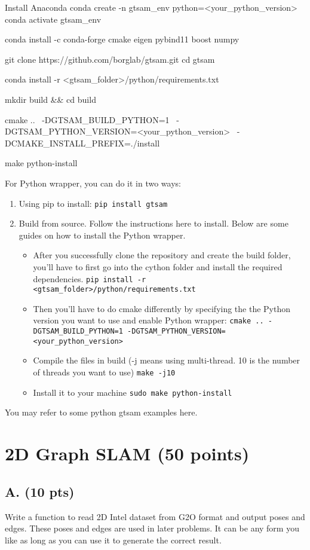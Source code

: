 \documentclass[tp]{lcc}
\begin{document}
Install Anaconda 
conda create -n gtsam_env python=<your\_python\_version>
conda activate gtsam_env

conda install -c conda-forge cmake eigen pybind11 boost numpy

git clone https://github.com/borglab/gtsam.git
cd gtsam

conda install -r <gtsam\_folder>/python/requirements.txt

mkdir build && cd build

cmake .. \
  -DGTSAM_BUILD_PYTHON=1 \
  -DGTSAM_PYTHON_VERSION=<your\_python\_version> \
  -DCMAKE_INSTALL_PREFIX=./install

make python-install


For Python wrapper, you can do it in two ways:

\begin{enumerate}
    \item Using pip to install: \texttt{pip install gtsam}
    \item Build from source. Follow the instructions here to install. Below are some guides on how to install the Python wrapper.
    \begin{itemize}
        \item After you successfully clone the repository and create the build folder, you'll have to first go into the cython folder and install the required dependencies. \texttt{pip install -r <gtsam\_folder>/python/requirements.txt}
        \item Then you'll have to do cmake differently by specifying the the Python version you want to use and enable Python wrapper: \texttt{cmake .. -DGTSAM\_BUILD\_PYTHON=1 -DGTSAM\_PYTHON\_VERSION=<your\_python\_version>}
        \item Compile the files in build (-j means using multi-thread. 10 is the number of threads you want to use) \texttt{make -j10}
        \item Install it to your machine \texttt{sudo make python-install}
    \end{itemize}
\end{enumerate}

You may refer to some python gtsam examples here.

\section{2D Graph SLAM (50 points)}
\subsection{A. (10 pts)}
Write a function to read 2D Intel dataset from G2O format and output poses and edges. These poses and edges are used in later problems. It can be any form you like as long as you can use it to generate the correct result.
\end{document}
